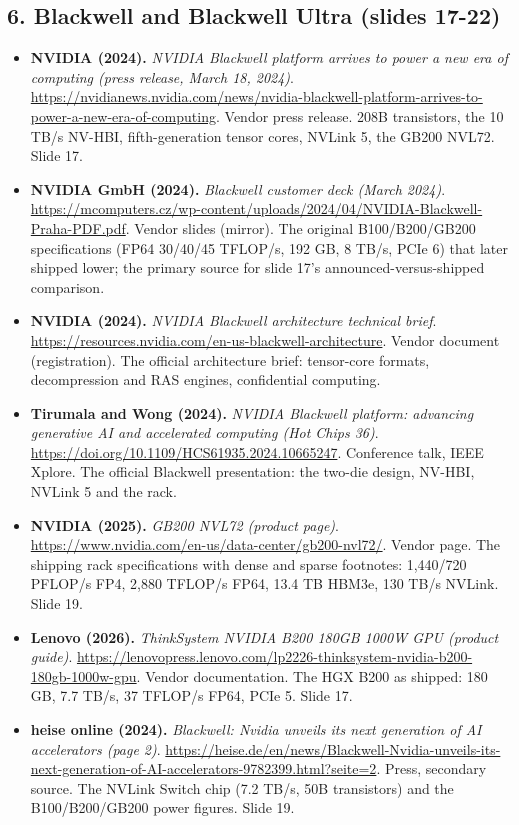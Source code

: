 \subsection*{6. Blackwell and Blackwell Ultra (slides 17-22)}
\begin{itemize}[leftmargin=1.2em,itemsep=3pt]\sloppy
\item \textbf{NVIDIA (2024).} \textit{NVIDIA Blackwell platform arrives to power a new era of computing (press release, March 18, 2024)}. \url{https://nvidianews.nvidia.com/news/nvidia-blackwell-platform-arrives-to-power-a-new-era-of-computing}. Vendor press release. 208B transistors, the 10 TB/s NV-HBI, fifth-generation tensor cores, NVLink 5, the GB200 NVL72. Slide 17.
\item \textbf{NVIDIA GmbH (2024).} \textit{Blackwell customer deck (March 2024)}. \url{https://mcomputers.cz/wp-content/uploads/2024/04/NVIDIA-Blackwell-Praha-PDF.pdf}. Vendor slides (mirror). The original B100/B200/GB200 specifications (FP64 30/40/45 TFLOP/s, 192 GB, 8 TB/s, PCIe 6) that later shipped lower; the primary source for slide 17's announced-versus-shipped comparison.
\item \textbf{NVIDIA (2024).} \textit{NVIDIA Blackwell architecture technical brief}. \url{https://resources.nvidia.com/en-us-blackwell-architecture}. Vendor document (registration). The official architecture brief: tensor-core formats, decompression and RAS engines, confidential computing.
\item \textbf{Tirumala and Wong (2024).} \textit{NVIDIA Blackwell platform: advancing generative AI and accelerated computing (Hot Chips 36)}. \url{https://doi.org/10.1109/HCS61935.2024.10665247}. Conference talk, IEEE Xplore. The official Blackwell presentation: the two-die design, NV-HBI, NVLink 5 and the rack.
\item \textbf{NVIDIA (2025).} \textit{GB200 NVL72 (product page)}. \url{https://www.nvidia.com/en-us/data-center/gb200-nvl72/}. Vendor page. The shipping rack specifications with dense and sparse footnotes: 1,440/720 PFLOP/s FP4, 2,880 TFLOP/s FP64, 13.4 TB HBM3e, 130 TB/s NVLink. Slide 19.
\item \textbf{Lenovo (2026).} \textit{ThinkSystem NVIDIA B200 180GB 1000W GPU (product guide)}. \url{https://lenovopress.lenovo.com/lp2226-thinksystem-nvidia-b200-180gb-1000w-gpu}. Vendor documentation. The HGX B200 as shipped: 180 GB, 7.7 TB/s, 37 TFLOP/s FP64, PCIe 5. Slide 17.
\item \textbf{heise online (2024).} \textit{Blackwell: Nvidia unveils its next generation of AI accelerators (page 2)}. \url{https://heise.de/en/news/Blackwell-Nvidia-unveils-its-next-generation-of-AI-accelerators-9782399.html?seite=2}. Press, secondary source. The NVLink Switch chip (7.2 TB/s, 50B transistors) and the B100/B200/GB200 power figures. Slide 19.

\end{itemize}
